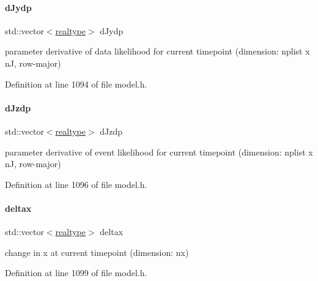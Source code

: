 \mbox{\label{classamici_1_1_model_a6cabcac49200072c8efd301339f5f445}} 
\paragraph{\texorpdfstring{d\+Jydp}{dJydp}}
{\footnotesize\ttfamily std\+::vector$<$\mbox{\hyperlink{namespaceamici_a1bdce28051d6a53868f7ccbf5f2c14a3}{realtype}}$>$ d\+Jydp}

parameter derivative of data likelihood for current timepoint (dimension\+: nplist x nJ, row-\/major) 

Definition at line 1094 of file model.\+h.

\mbox{\label{classamici_1_1_model_a0a3bc96cfcf3d3469d9351f8759191b1}} 
\paragraph{\texorpdfstring{d\+Jzdp}{dJzdp}}
{\footnotesize\ttfamily std\+::vector$<$\mbox{\hyperlink{namespaceamici_a1bdce28051d6a53868f7ccbf5f2c14a3}{realtype}}$>$ d\+Jzdp}

parameter derivative of event likelihood for current timepoint (dimension\+: nplist x nJ, row-\/major) 

Definition at line 1096 of file model.\+h.

\mbox{\label{classamici_1_1_model_ab259d30491631b3ad9fcf84f4f84da75}} 
\paragraph{\texorpdfstring{deltax}{deltax}}
{\footnotesize\ttfamily std\+::vector$<$\mbox{\hyperlink{namespaceamici_a1bdce28051d6a53868f7ccbf5f2c14a3}{realtype}}$>$ deltax}

change in x at current timepoint (dimension\+: nx) 

Definition at line 1099 of file model.\+h.

\mbox{\label{classamici_1_1_model_a3be615f0dfbef0fb7bee840abde04459}} 
